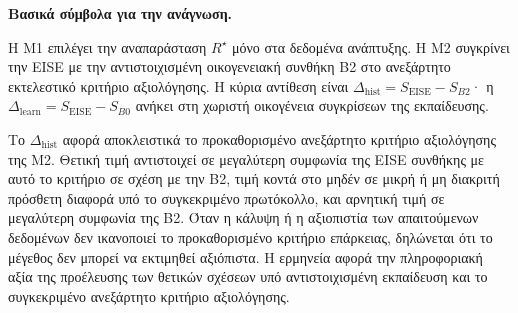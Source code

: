\documentclass[11pt,a4paper]{article}
\begin{document}
\par\noindent\textbf{Βασικά σύμβολα για την ανάγνωση.}\par\smallskip
{}\par

Η M1 επιλέγει την αναπαράσταση $R^\star$ μόνο στα δεδομένα ανάπτυξης. Η M2 συγκρίνει την EISE με την αντιστοιχισμένη οικογενειακή συνθήκη B2 στο ανεξάρτητο εκτελεστικό κριτήριο αξιολόγησης. Η κύρια αντίθεση είναι $\Delta_{\mathrm{hist}}=S_{\mathrm{EISE}}-S_{B2}$· η $\Delta_{\mathrm{learn}}=S_{\mathrm{EISE}}-S_{B0}$ ανήκει στη χωριστή οικογένεια συγκρίσεων της εκπαίδευσης.

Το $\Delta_{\mathrm{hist}}$ αφορά αποκλειστικά το προκαθορισμένο ανεξάρτητο κριτήριο αξιολόγησης της M2. Θετική τιμή αντιστοιχεί σε μεγαλύτερη συμφωνία της EISE συνθήκης με αυτό το κριτήριο σε σχέση με την B2, τιμή κοντά στο μηδέν σε μικρή ή μη διακριτή πρόσθετη διαφορά υπό το συγκεκριμένο πρωτόκολλο, και αρνητική τιμή σε μεγαλύτερη συμφωνία της B2. Όταν η κάλυψη ή η αξιοπιστία των απαιτούμενων δεδομένων δεν ικανοποιεί το προκαθορισμένο κριτήριο επάρκειας, δηλώνεται ότι το μέγεθος δεν μπορεί να εκτιμηθεί αξιόπιστα. Η ερμηνεία αφορά την πληροφοριακή αξία της προέλευσης των θετικών σχέσεων υπό αντιστοιχισμένη εκπαίδευση και το συγκεκριμένο ανεξάρτητο κριτήριο αξιολόγησης.
\end{document}
